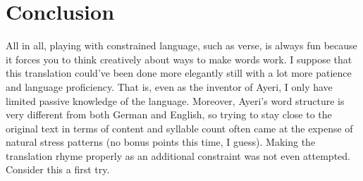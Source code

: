 \documentclass[12pt,paper=a4]{scrartcl}
\begin{document}
\section{Conclusion}

All in all, playing with constrained language, such as verse, is always fun
because it forces you to think creatively about ways to make words work. I
suppose that this translation could've been done more elegantly still with a
lot more patience and language proficiency. That is, even as the inventor of
Ayeri, I only have limited passive knowledge of the language. Moreover, Ayeri's
word structure is very different from both German and English, so trying to
stay close to the original text in terms of content and syllable count often
came at the expense of natural stress patterns (no bonus points this time, I
guess). Making the translation rhyme properly as an additional constraint was
not even attempted. Consider this a first try.



\begingroup\multicolsep=0pt
\printglossary[
	style=threecolumn,
	type=leipzig,
]
\endgroup

\end{document}
